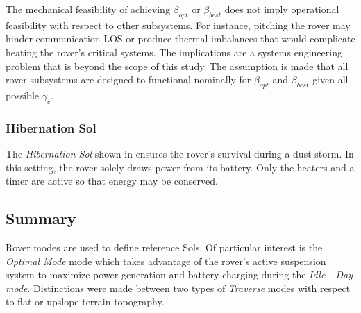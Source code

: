 The mechanical feasibility of achieving $\beta_{opt}$ or $\beta_{best}$ does not imply operational feasibility with respect to other subsystems. For instance, pitching the rover may hinder communication \ac{LOS} or produce thermal imbalances that would complicate heating the rover's critical systems. The implications are a systems engineering problem that is beyond the scope of this study. The assumption is made that all rover subsystems are designed to functional nominally for $\beta_{opt}$ and $\beta_{best}$ given all possible $\gamma_{c}$.

\subsubsection{Hibernation Sol}
\label{sec:ReferenceSols:HibernationSol}
The \textit{Hibernation Sol} shown in  ensures the rover's survival  during a dust storm. In this setting, the rover solely draws power from its battery. Only the heaters and a timer are active so that energy may be conserved.



\subsection{Summary}
\label{sec:ReferenceSols:SummaryAndConclusion}
Rover modes are used to define reference Sols. Of particular interest is the \textit{Optimal Mode} mode which takes advantage of the rover's active suspension system to maximize power generation and battery charging during the \textit{Idle - Day mode}. Distinctions were made between two types of \textit{Traverse} modes with respect to flat or upslope terrain topography.
